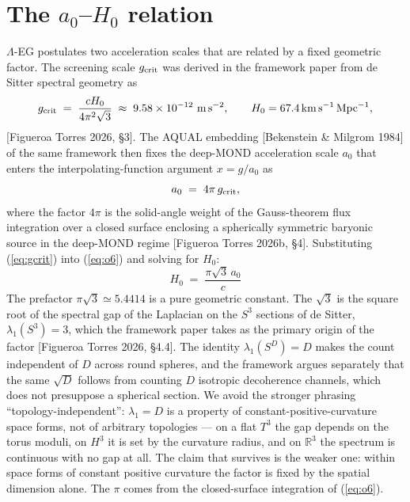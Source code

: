 \documentclass[11pt,a4paper]{article}
\begin{document}
\section{The $a_0$--$H_0$ relation}

$\Lambda$-EG postulates two acceleration scales that are related by a fixed
geometric factor. The screening scale $g_{\rm crit}$ was derived in the
framework paper from de Sitter spectral geometry as
\begin{equation}
g_{\rm crit} \;=\; \frac{c H_0}{4\pi^2 \sqrt{3}}
\;\approx\; 9.58 \times 10^{-12}\ {\rm m\,s^{-2}},
\qquad H_0 = 67.4\,{\rm km\,s^{-1}\,Mpc^{-1}},
\label{eq:gcrit}
\end{equation}
[Figueroa Torres 2026, \S3]. The AQUAL embedding [Bekenstein \& Milgrom 1984]
of the same framework then fixes the deep-MOND acceleration scale $a_0$ that
enters the interpolating-function argument $x = g/a_0$ as
\begin{equation}
a_0 \;=\; 4\pi\, g_{\rm crit},
\label{eq:o6}
\end{equation}
where the factor $4\pi$ is the solid-angle weight of the Gauss-theorem flux
integration over a closed surface enclosing a spherically symmetric baryonic
source in the deep-MOND regime [Figueroa Torres 2026b, \S4]. Substituting
(\ref{eq:gcrit}) into (\ref{eq:o6}) and solving for $H_0$:
\begin{equation}
\boxed{\; H_0 \;=\; \frac{\pi \sqrt{3}\, a_0}{c} \;}
\label{eq:law}
\end{equation}
The prefactor $\pi\sqrt{3} \simeq 5.4414$ is a pure geometric constant. The
$\sqrt{3}$ is the square root of the spectral gap of the Laplacian on the
$S^3$ sections of de Sitter, $\lambda_1(S^3) = 3$, which the framework paper
takes as the primary origin of the factor [Figueroa Torres 2026, \S4.4]. The
identity $\lambda_1(S^D) = D$ makes the count independent of $D$ across
round spheres, and the framework argues separately that the same $\sqrt{D}$
follows from counting $D$ isotropic decoherence channels, which does not
presuppose a spherical section. We avoid the stronger phrasing
``topology-independent'': $\lambda_1 = D$ is a property of constant-positive-curvature
space forms, not of arbitrary topologies --- on a flat $T^3$ the gap depends
on the torus moduli, on $H^3$ it is set by the curvature radius, and on
$\mathbb{R}^3$ the spectrum is continuous with no gap at all. The claim that
survives is the weaker one: within space forms of constant positive
curvature the factor is fixed by the spatial dimension alone. The $\pi$
comes from the closed-surface integration of (\ref{eq:o6}).
\end{document}
